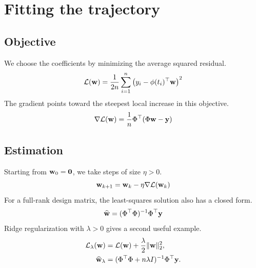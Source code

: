 \section{Fitting the trajectory}
\subsection{Objective}
We choose the coefficients by minimizing the average squared residual.
\begin{equation}
  \mathcal{L}(\mathbf{w}) = \frac{1}{2n}\sum_{i=1}^{n}
    \left(y_i-\mathbf{\phi}(t_i)^\top\mathbf{w}\right)^2
  \label{eq:squared_loss}
\end{equation}
The gradient points toward the steepest local increase in this objective.
\begin{equation}
  \nabla\mathcal{L}(\mathbf{w}) = \frac{1}{n}\Phi^\top(\Phi\mathbf{w}-\mathbf{y})
  \label{eq:loss_gradient}
\end{equation}
\subsection{Estimation}
Starting from $\mathbf{w}_0=\mathbf{0}$, we take steps of size $\eta > 0$.
\begin{equation}
  \mathbf{w}_{k+1} = \mathbf{w}_k - \eta\nabla\mathcal{L}(\mathbf{w}_k)
  \label{eq:gradient_descent}
\end{equation}
For a full-rank design matrix, the least-squares solution also has a closed form.
\begin{equation}
  \widehat{\mathbf{w}} = (\Phi^\top\Phi)^{-1}\Phi^\top\mathbf{y}
  \label{eq:least_squares}
\end{equation}
Ridge regularization with $\lambda > 0$ gives a second useful example.
\begin{align}
  \mathcal{L}_{\lambda}(\mathbf{w})
    &= \mathcal{L}(\mathbf{w}) + \frac{\lambda}{2}\|\mathbf{w}\|_2^2, \\
  \widehat{\mathbf{w}}_{\lambda}
    &= (\Phi^\top\Phi+n\lambda I)^{-1}\Phi^\top\mathbf{y}.
  \label{eq:ridge_solution}
\end{align}
